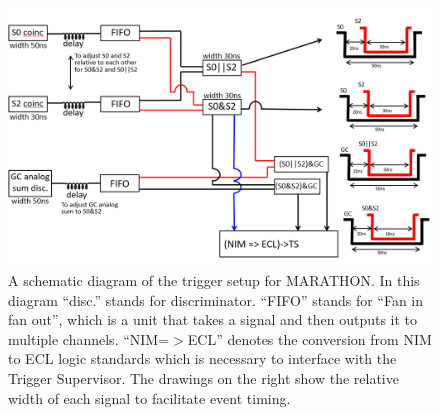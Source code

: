 \begin{figure}
\begin{center}
	\includegraphics[width=\textwidth]{./setup/fig/trigger_diagram.png}
	\caption{A schematic diagram of the trigger setup for MARATHON. In this diagram ``disc.'' stands for discriminator. ``FIFO'' stands for ``Fan in fan out'', which is a unit that takes a signal and then outputs it to multiple channels. ``NIM=$>$ECL'' denotes the conversion from NIM to ECL logic standards which is necessary to interface with the Trigger Supervisor. The drawings on the right show the relative width of each signal to facilitate event timing.\cite{Rey}}
	\label{fig:trig_schem}
\end{center}
\end{figure}